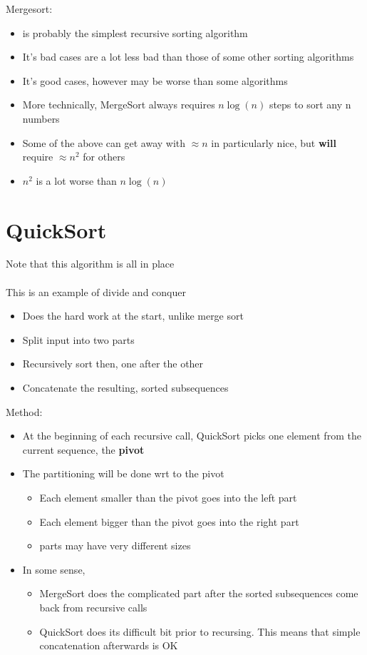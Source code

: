 \documentclass{article}[18pt]
\begin{document}
Mergesort:
\begin{itemize}
	\item is probably the simplest recursive sorting algorithm
	\item It's bad cases are a lot less bad than those of some other sorting algorithms
	\item It's good cases, however may be worse than some algorithms
	\item More technically, MergeSort always requires $n\log (n)$ steps to sort any n numbers
	\item Some of the above can get away with $\approx n$ in particularly nice, but \textbf{will} require $\approx n^2$ for others
	\item $n^2$ is a lot worse than $n\log(n)$
\end{itemize}
\section{QuickSort}
Note that this algorithm is all in place\\
\\
This is an example of divide and conquer
\begin{itemize}
	\item Does the hard work at the start, unlike merge sort
	\item Split input into two parts
	\item Recursively sort then, one after the other
	\item Concatenate the resulting, sorted subsequences
\end{itemize}
Method:
\begin{itemize}
	\item At the beginning of each recursive call, QuickSort picks one element from the current sequence, the \textbf{pivot}
	\item The partitioning will be done wrt to the pivot
	\begin{itemize}
		\item Each element smaller than the pivot goes into the left part
		\item Each element bigger than the pivot goes into the right part
		\item parts may have very different sizes
	\end{itemize}
	\item In some sense,
	\begin{itemize}
		\item MergeSort does the complicated part after the sorted subsequences come back from recursive calls
		\item QuickSort does its difficult bit prior to recursing. This means that simple concatenation afterwards is OK
	\end{itemize}
\end{itemize}
\end{document}
